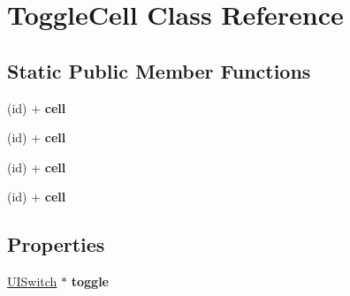 \hypertarget{interface_toggle_cell}{
\section{\-Toggle\-Cell \-Class \-Reference}
\label{interface_toggle_cell}
}
\subsection*{\-Static \-Public \-Member \-Functions}
\begin{DoxyCompactItemize}
\item 
\hypertarget{interface_toggle_cell_af7ef42504b53f16a6fc5199a99e263ab}{
(id) + {\bfseries cell}}
\label{interface_toggle_cell_af7ef42504b53f16a6fc5199a99e263ab}

\item 
\hypertarget{interface_toggle_cell_af7ef42504b53f16a6fc5199a99e263ab}{
(id) + {\bfseries cell}}
\label{interface_toggle_cell_af7ef42504b53f16a6fc5199a99e263ab}

\item 
\hypertarget{interface_toggle_cell_af7ef42504b53f16a6fc5199a99e263ab}{
(id) + {\bfseries cell}}
\label{interface_toggle_cell_af7ef42504b53f16a6fc5199a99e263ab}

\item 
\hypertarget{interface_toggle_cell_af7ef42504b53f16a6fc5199a99e263ab}{
(id) + {\bfseries cell}}
\label{interface_toggle_cell_af7ef42504b53f16a6fc5199a99e263ab}

\end{DoxyCompactItemize}
\subsection*{\-Properties}
\begin{DoxyCompactItemize}
\item 
\hypertarget{interface_toggle_cell_a4a9ee6f1844a4538660144d21dc144d5}{
\hyperlink{class_u_i_switch}{\-U\-I\-Switch} $\ast$ {\bfseries toggle}}
\label{interface_toggle_cell_a4a9ee6f1844a4538660144d21dc144d5}

\end{DoxyCompactItemize}


